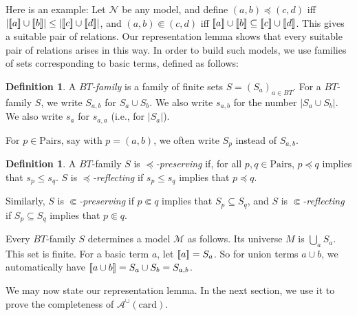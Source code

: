 \documentclass[letterpaper]{article}
\theoremstyle{definition}
\newtheorem{definition}[theorem]{Definition}
\newcommand{\semantics}[1]{[\![\mbox{\em $ #1 $\/}]\!]}
\newcommand{\Model}{\mathcal{M}}
\newcommand{\Nodel}{\mathcal{N}}
\newcommand{\Aunion}{\mathscr{A}^{\cup}}
\newcommand{\card}{\mathrm{card}}
\newcommand{\Pairs}{\mbox{Pairs}}
\newcommand{\precsubseteq}{\Subset}
\newcommand{\suitable}{suitable}%
\begin{document}
Here is an example:
Let $\Nodel$ be any model, and define $(a,b) \preceq (c,d)$ iff 
$|\semantics{a} \cup \semantics{b}| \leq
|\semantics{c} \cup \semantics{d}|$, and 
 $(a,b) \precsubseteq (c,d)$ iff 
$\semantics{a} \cup \semantics{b} \subseteq
\semantics{c} \cup \semantics{d}$.
This gives a {\suitable} pair of relations.
Our representation lemma shows that every {\suitable} pair of relations arises in
this way.  In order to build such models, we use families of sets corresponding to basic terms, defined as follows:

\begin{definition}
 A \emph{$BT$-family} is a family of finite sets
$S = (S_a)_{a\in BT}$.
For a $BT$-family $S$, we write $S_{a,b}$ for $S_a \cup S_b$.  We also write $s_{a,b}$
for the number  $|S_a\cup S_b|$.  
We also write $s_a$ for $s_{a,a}$ (i.e., for $|S_a|$).

For $p\in\Pairs$, say with $p= (a,b)$, we often write $S_p$ instead of $S_{a,b}$.
\end{definition}

\begin{definition}\label{def-family-model}
A $BT$-family $S$ is \emph{$\preceq$-preserving} if, for all $p,q \in \Pairs$, $p \preceq q$ implies that $s_{p} \le s_{q}$.  $S$ is \emph{$\preceq$-reflecting} if $s_{p} \le s_{q}$ implies that $p \preceq q$.

Similarly, $S$ is \emph{$\precsubseteq$-preserving}
if $p \precsubseteq q$ implies that $S_{p} \subseteq S_{q}$, and 
$S$ is \emph{$\precsubseteq$-reflecting} if 
$S_{p} \subseteq S_{q}$ implies that $p \precsubseteq  q$. 

Every $BT$-family $S$ determines
a  model $\Model$ as follows.  Its universe $M$ is  $\bigcup_{a} S_a$.
This set is finite.
For a basic term  $a$, let $\semantics{a} = S_{a}$. 
So  for union terms $a\cup b$, we
automatically
have $\semantics{a\cup b} = S_{a} \cup S_{b} = S_{a,b}$.
\end{definition}


We may now state our representation lemma.  In the next section, we use it to prove the completeness of $\Aunion(\card)$.
\end{document}
